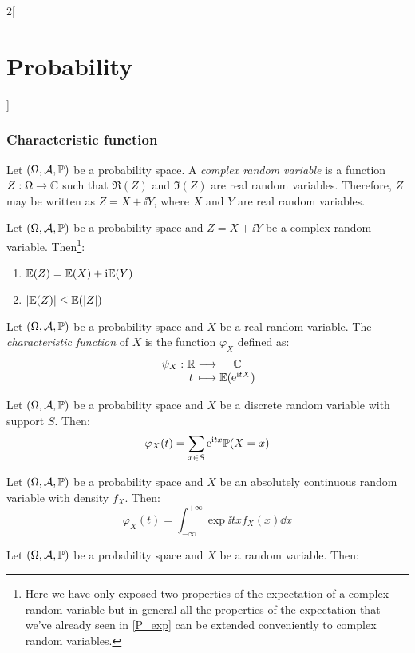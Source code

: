 \documentclass[../../../main.tex]{subfiles}
\begin{document}
\begin{multicols}{2}[\section{Probability}]
    \subsubsection{Characteristic function}
    \begin{definition}
        Let $(\Omega,\mathcal{A},\mathbb{P})$ be a probability space. A \emph{complex random variable} is a function $Z:\Omega\rightarrow\mathbb{C}$ such that $\Re(Z)$ and $\Im(Z)$ are real random variables. Therefore, $Z$ may be written as $Z=X+\ii Y$, where $X$ and $Y$ are real random variables.
    \end{definition}
    \begin{prop}
        Let $(\Omega,\mathcal{A},\mathbb{P})$ be a probability space and $Z=X+\ii Y$ be a complex random variable. Then\footnote{Here we have only exposed two properties of the expectation of a complex random variable but in general all the properties of the expectation that we've already seen in \cref{P_exp} can be extended conveniently to complex random variables.}:
        \begin{enumerate}
            \item $\mathbb{E}(Z)=\mathbb{E}(X)+\mathrm{i}\mathbb{E}(Y)$
            \item $|\mathbb{E}(Z)|\leq \mathbb{E}(|Z|)$
        \end{enumerate}
    \end{prop}
    \begin{definition}
        Let $(\Omega,\mathcal{A},\mathbb{P})$ be a probability space and $X$ be a real random variable. The \textit{characteristic function} of $X$ is the function $\varphi_X$ defined as:
        $$\function{\psi_X}{\RR}{\CC}{t}{\Exp(\exp{\ii tX})}$$
    \end{definition}
    \begin{prop}
        Let $(\Omega,\mathcal{A},\mathbb{P})$ be a probability space and $X$ be a discrete random variable with support $S$. Then:
        $$\varphi_X(t)=\sum_{x\in S}\mathrm{e}^{\mathrm{i} tx}\mathbb{P}(X=x)$$
    \end{prop}
    \begin{prop}
        Let $(\Omega,\mathcal{A},\mathbb{P})$ be a probability space and $X$ be an absolutely continuous random variable with density $f_X$. Then:
        $$\varphi_X(t)=\int_{-\infty}^{+\infty}\exp{\ii tx}f_X(x)\dd x$$
    \end{prop}
    \begin{prop}
        Let $(\Omega,\mathcal{A},\mathbb{P})$ be a probability space and $X$ be a random variable. Then:
        \begin{enumerate}

\end{enumerate}
\end{prop}
\end{multicols}
\end{document}
